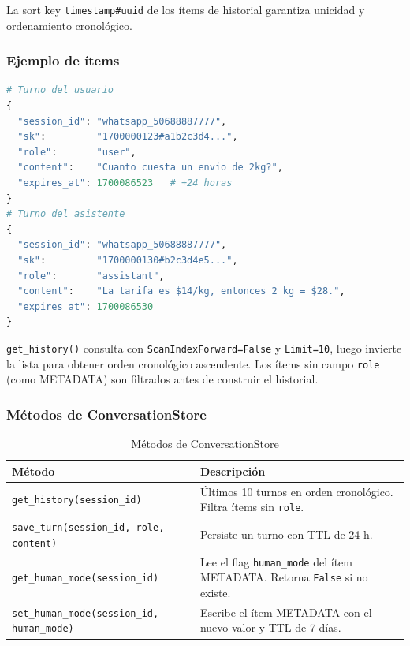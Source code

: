 \documentclass[12pt,a4paper]{article}
\begin{document}
La sort key \texttt{timestamp\#uuid} de los ítems de historial garantiza unicidad y ordenamiento cronológico.

\subsubsection*{Ejemplo de ítems}

\begin{lstlisting}[language=Python, caption={Items de ejemplo en DynamoDB}]
# Turno del usuario
{
  "session_id": "whatsapp_50688887777",
  "sk":         "1700000123#a1b2c3d4...",
  "role":       "user",
  "content":    "Cuanto cuesta un envio de 2kg?",
  "expires_at": 1700086523   # +24 horas
}
# Turno del asistente
{
  "session_id": "whatsapp_50688887777",
  "sk":         "1700000130#b2c3d4e5...",
  "role":       "assistant",
  "content":    "La tarifa es $14/kg, entonces 2 kg = $28.",
  "expires_at": 1700086530
}
\end{lstlisting}

\texttt{get\_history()} consulta con \texttt{ScanIndexForward=False} y \texttt{Limit=10},
luego invierte la lista para obtener orden cronológico ascendente.
Los ítems sin campo \texttt{role} (como METADATA) son filtrados antes de construir el historial.

\subsubsection*{Métodos de ConversationStore}

\begin{table}[H]
\centering
\begin{tabular}{@{}lp{9cm}@{}}
\toprule
\textbf{Método} & \textbf{Descripción} \\
\midrule
\texttt{get\_history(session\_id)} & Últimos 10 turnos en orden cronológico. Filtra ítems sin \texttt{role}. \\
\texttt{save\_turn(session\_id, role, content)} & Persiste un turno con TTL de 24 h. \\
\texttt{get\_human\_mode(session\_id)} & Lee el flag \texttt{human\_mode} del ítem METADATA. Retorna \texttt{False} si no existe. \\
\texttt{set\_human\_mode(session\_id, human\_mode)} & Escribe el ítem METADATA con el nuevo valor y TTL de 7 días. \\
\bottomrule
\end{tabular}
\caption{Métodos de ConversationStore}
\end{table}
\end{document}
